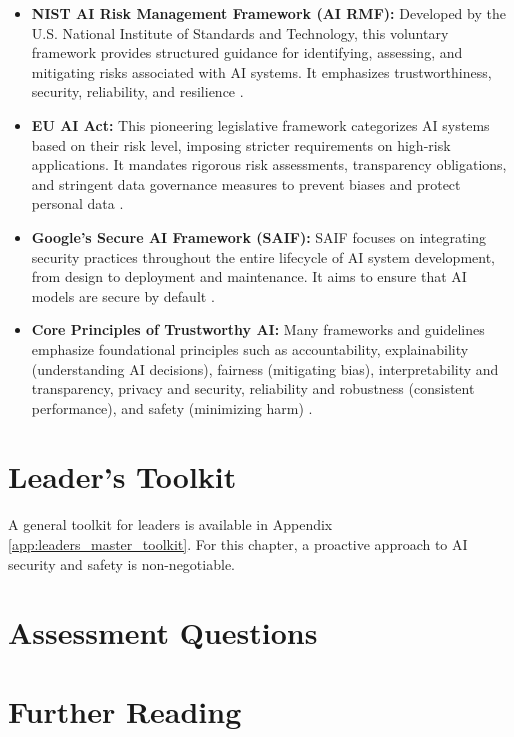 \begin{itemize}
    \item \textbf{NIST AI Risk Management Framework (AI RMF):} Developed by the U.S. National Institute of Standards and Technology, this voluntary framework provides structured guidance for identifying, assessing, and mitigating risks associated with AI systems. It emphasizes trustworthiness, security, reliability, and resilience \parencite{NIST2023AIRMF}.
    \item \textbf{EU AI Act:} This pioneering legislative framework categorizes AI systems based on their risk level, imposing stricter requirements on high-risk applications. It mandates rigorous risk assessments, transparency obligations, and stringent data governance measures to prevent biases and protect personal data \parencite{EU_AI_Act_2024}.
    \item \textbf{Google's Secure AI Framework (SAIF):} SAIF focuses on integrating security practices throughout the entire lifecycle of AI system development, from design to deployment and maintenance. It aims to ensure that AI models are secure by default \parencite{SafetyGoogle2023}.
    \item \textbf{Core Principles of Trustworthy AI:} Many frameworks and guidelines emphasize foundational principles such as accountability, explainability (understanding AI decisions), fairness (mitigating bias), interpretability and transparency, privacy and security, reliability and robustness (consistent performance), and safety (minimizing harm) \parencite{MaximAI2025}.
\end{itemize}

\section{Leader's Toolkit}
\label{sec:security_leaders_toolkit}

A general toolkit for leaders is available in Appendix \ref{app:leaders_master_toolkit}. For this chapter, a proactive approach to AI security and safety is non-negotiable.

\section{Assessment Questions}
\label{sec:security_assessment_questions}

\section{Further Reading}
\label{sec:security_further_reading}